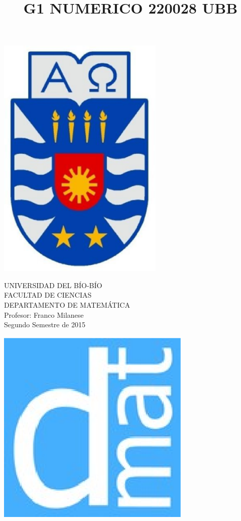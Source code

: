 \documentclass[11pt]{article}
\begin{document}
\title{G1 NUMERICO 220028 UBB}

{\begin{minipage}{2cm}
\hspace*{1cm}\includegraphics[width=0.6\textwidth]{escubo-ubb.eps}
\end{minipage}
\begin{minipage}{12cm}
\small
{\bf \rm 
{
\begin{center}
{\footnotesize UNIVERSIDAD DEL B\'IO-B\'IO} \\
{\scriptsize FACULTAD DE CIENCIAS}  \\
{\scriptsize DEPARTAMENTO DE MATEM\'ATICA}  \\
{\scriptsize Profesor:  Franco Milanese}\\
{\scriptsize Segundo Semestre de 2015}
\end{center}
}}
\end{minipage}}
{\begin{minipage}{2cm}
\hspace*{-0.5cm}\vspace*{-0.05cm}\includegraphics[width=0.7\textwidth]{escudo-dmat.eps}
\end{minipage}}
\end{document}
